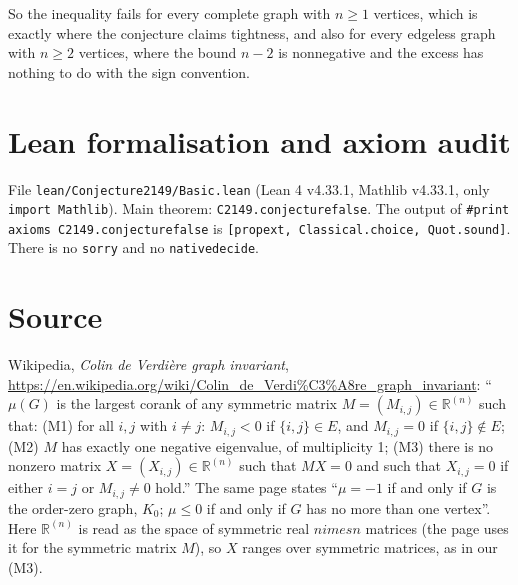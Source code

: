 \documentclass[11pt]{article}
\renewcommand{\_}{\oldus\allowbreak}
\theoremstyle{definition}
\theoremstyle{remark}
\begin{document}
So the inequality fails for every complete graph with $n\ge1$ vertices, which is exactly where the
conjecture claims tightness, and also for every edgeless graph with $n\ge2$ vertices, where the bound
$n-2$ is nonnegative and the excess has nothing to do with the sign convention.

\section{Lean formalisation and axiom audit}

File \texttt{lean/Conjecture2149/Basic.lean} (Lean 4 v4.33.1, Mathlib v4.33.1, only
\texttt{import Mathlib}). Main theorem: \texttt{C2149.conjecture\_2149\_false}. The output of
\texttt{\#print axioms C2149.conjecture\_2149\_false} is \texttt{[propext, Classical.choice,
Quot.sound]}. There is no \texttt{sorry} and no \texttt{native\_decide}.

\section{Source}
Wikipedia, \emph{Colin de Verdi\`ere graph invariant},
\url{https://en.wikipedia.org/wiki/Colin_de_Verdi%C3%A8re_graph_invariant}: ``$\mu(G)$ is the largest
corank of any symmetric matrix $M=(M_{i,j})\in\mathbb{R}^{(n)}$ such that: (M1) for all $i,j$ with
$i\neq j$: $M_{i,j}<0$ if $\{i,j\}\in E$, and $M_{i,j}=0$ if $\{i,j\}\notin E$; (M2) $M$ has exactly one
negative eigenvalue, of multiplicity 1; (M3) there is no nonzero matrix $X=(X_{i,j})\in\mathbb{R}^{(n)}$
such that $MX=0$ and such that $X_{i,j}=0$ if either $i=j$ or $M_{i,j}\neq0$ hold.'' The same page
states ``$\mu=-1$ if and only if $G$ is the order-zero graph, $K_0$; $\mu\le0$ if and only if $G$ has no
more than one vertex''. Here $\mathbb{R}^{(n)}$ is read as the space of symmetric real $n	imes n$ matrices (the page uses
it for the symmetric matrix $M$), so $X$ ranges over symmetric matrices, as in our (M3).
\end{document}
